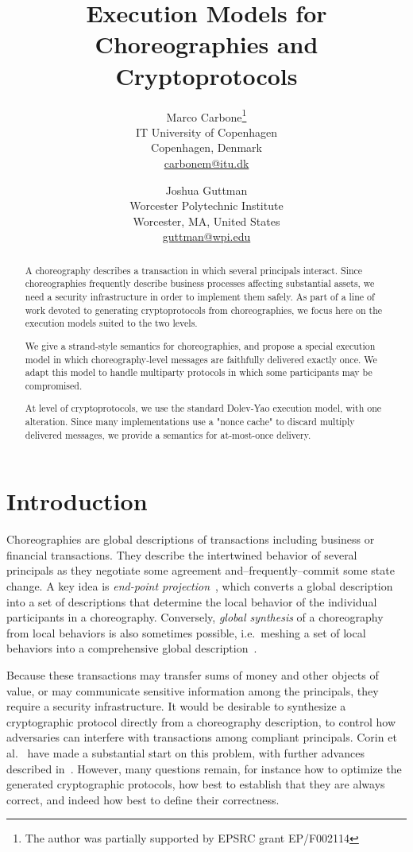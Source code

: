 \documentclass[copyright]{eptcs}
\title{Execution Models for Choreographies and Cryptoprotocols}
\author{Marco Carbone\thanks{The author was partially supported by EPSRC grant EP/F002114}\\
IT University of Copenhagen\\
Copenhagen, Denmark\\
\url{carbonem@itu.dk}\\
\and
Joshua Guttman{}\\
Worcester Polytechnic Institute\\
Worcester, MA, United States\\
\url{guttman@wpi.edu}\\
}
\begin{document}
\maketitle

\begin{abstract}
A choreography describes a transaction in which several principals
interact.  Since choreographies frequently describe business processes
affecting substantial assets, we need a security infrastructure in
order to implement them safely.  As part of a line of work devoted to
generating cryptoprotocols from choreographies, we focus here on the
execution models suited to the two levels.   

We give a strand-style semantics for choreographies, and propose a
special execution model in which choreography-level messages are
faithfully delivered exactly once.  We adapt this model to handle
multiparty protocols in which some participants may be compromised.  

At level of cryptoprotocols, we use the standard Dolev-Yao execution
model, with one alteration.  Since many implementations use a "nonce
cache" to discard multiply delivered messages, we provide a semantics
for at-most-once delivery.   
\end{abstract}

\section{Introduction}
\label{sec:introduction}


Choreographies are global descriptions of transactions including
business or financial transactions.  They describe the intertwined
behavior of several principals as they negotiate some agreement
and--frequently--commit some state change.  A key idea is
\emph{end-point projection}~\cite{carbone.honda.yoshida:esop07}, which
converts a global description into a set of descriptions that
determine the local behavior of the individual participants in a
choreography.  Conversely, \emph{global synthesis} of a choreography
from local behaviors is also sometimes possible, i.e.~meshing a set of
local behaviors into a comprehensive global
description~\cite{MostrousYoshidaHonda09}.

Because these transactions may transfer sums of money and other
objects of value, or may communicate sensitive information among the
principals, they require a security infrastructure.  It would be
desirable to synthesize a cryptographic protocol directly from a
choreography description, to control how adversaries can interfere
with transactions among compliant principals.  Corin et
al.~\cite{CDFBL08} have made a substantial start on this problem, with
further advances described in~\cite{BhargavanEtAl09}.  However, many
questions remain, for instance how to optimize the generated
cryptographic protocols, how best to establish that they are always
correct, and indeed how best to define their correctness.
\end{document}
